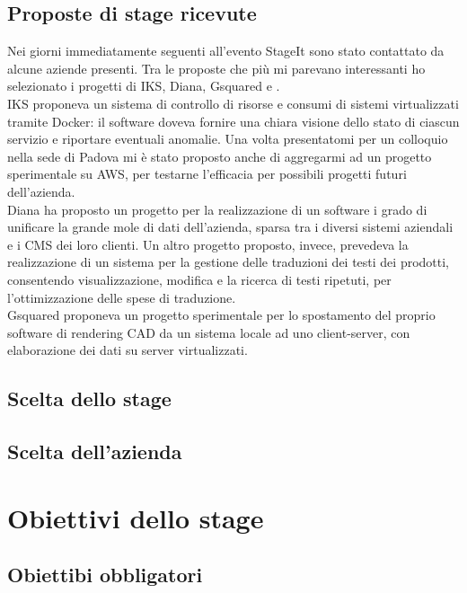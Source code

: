    \subsection{Proposte di stage ricevute}
   Nei giorni immediatamente seguenti all'evento StageIt sono stato contattato da alcune aziende presenti. Tra le proposte che più mi parevano interessanti ho selezionato i progetti di IKS, Diana, Gsquared e \nomeAzienda{}.
   \\
   IKS proponeva un sistema di controllo di risorse e consumi di sistemi virtualizzati tramite \gls{Docker}: il software doveva fornire una chiara visione dello stato di ciascun servizio e riportare eventuali anomalie. Una volta presentatomi per un colloquio nella sede di Padova mi è stato proposto anche di aggregarmi ad un progetto sperimentale su \gls{AWS}, per testarne l'efficacia per possibili progetti futuri dell'azienda.
   \\
   Diana ha proposto un progetto per la realizzazione di un software i grado di unificare la grande mole di dati dell'azienda, sparsa tra i diversi sistemi aziendali e i \gls{CMS} dei loro clienti. Un altro progetto proposto, invece, prevedeva la realizzazione di un sistema per la gestione delle traduzioni dei testi dei prodotti, consentendo visualizzazione, modifica e la ricerca di testi ripetuti, per l'ottimizzazione delle spese di traduzione.
   \\
   Gsquared proponeva un progetto sperimentale per lo spostamento del proprio software di rendering CAD da un sistema locale ad uno client-server, con elaborazione dei dati su server virtualizzati.
   
   \subsection{Scelta dello stage}

   \subsection{Scelta dell'azienda}

\section{Obiettivi dello stage}

   \subsection{Obiettibi obbligatori}


